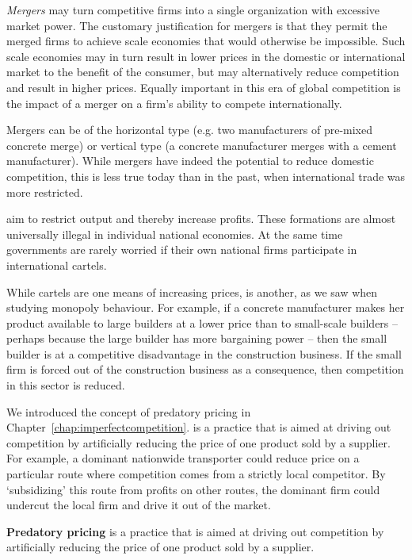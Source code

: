 \textit{Mergers} may turn competitive firms into a single organization
with excessive market power. The customary justification for mergers is that
they permit the merged firms to achieve scale economies that would otherwise
be impossible. Such scale economies may in turn result in lower prices in
the domestic or international market to the benefit of the consumer, but may
alternatively reduce competition and result in higher prices. Equally
important in this era of global competition is the impact of a merger on a
firm's ability to compete internationally.

Mergers can be of the horizontal type (e.g. two manufacturers of pre-mixed
concrete merge) or vertical type (a concrete manufacturer merges with a
cement manufacturer). While mergers have indeed the potential to reduce
domestic competition, this is less true today than in the past, when
international trade was more restricted.

 aim to restrict output and thereby increase profits.
These formations are almost universally illegal in individual national
economies. At the same time governments are rarely worried if their own
national firms participate in international cartels.

While cartels are one means of increasing prices,  is another, as we saw when studying monopoly behaviour. For
example, if a concrete manufacturer makes her product available to large
builders at a lower price than to small-scale builders -- perhaps because
the large builder has more bargaining power -- then the small builder is at a
competitive disadvantage in the construction business. If the small firm is
forced out of the construction business as a consequence, then competition
in this sector is reduced.

We introduced the concept of predatory pricing in Chapter~\ref{chap:imperfectcompetition}. 
 is a practice that is aimed at driving out
competition by artificially reducing the price of one product sold by a
supplier. For example, a dominant nationwide transporter could reduce price
on a particular route where competition comes from a strictly local
competitor. By `subsidizing' this route from profits on other routes, the
dominant firm could undercut the local firm and drive it out of the market.

\begin{DefBox}
	\textbf{Predatory pricing} is a practice that is aimed at driving out competition by artificially reducing the price of one product sold by a supplier.
\end{DefBox}

